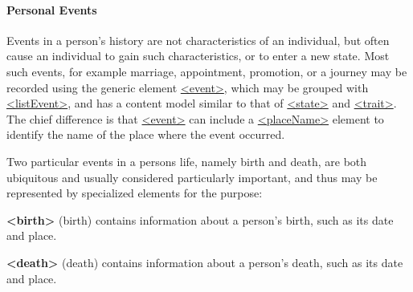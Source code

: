 \paragraph[{Personal Events}]{Personal Events}\label{NDPERSEpe}\par
Events in a person's history are not characteristics of an individual, but often cause an individual to gain such characteristics, or to enter a new state. Most such events, for example marriage, appointment, promotion, or a journey may be recorded using the generic element \hyperref[TEI.event]{<event>}, which may be grouped with \hyperref[TEI.listEvent]{<listEvent>}, and has a content model similar to that of \hyperref[TEI.state]{<state>} and \hyperref[TEI.trait]{<trait>}. The chief difference is that \hyperref[TEI.event]{<event>} can include a \hyperref[TEI.placeName]{<placeName>} element to identify the name of the place where the event occurred.\par
Two particular events in a persons life, namely birth and death, are both ubiquitous and usually considered particularly important, and thus may be represented by specialized elements for the purpose: 
\begin{sansreflist}
  
\item [\textbf{<birth>}] (birth) contains information about a person's birth, such as its date and place.
\item [\textbf{<death>}] (death) contains information about a person's death, such as its date and place.
\end{sansreflist}
\par
